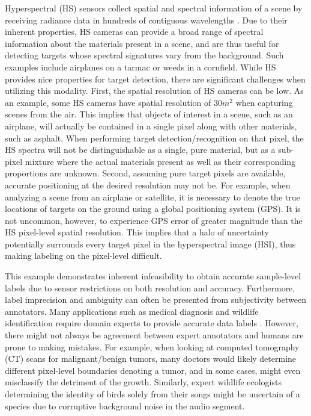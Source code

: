 Hyperspectral (HS) sensors collect spatial and spectral information of a scene by receiving radiance data in hundreds of contiguous wavelengths \citep{Zare2008Thesis}.  Due to their inherent properties, HS cameras can provide a broad range of spectral information about the materials present in a scene, and are thus useful for detecting targets whose spectral signatures vary from the background.  Such examples include airplanes on a tarmac or weeds in a cornfield.  While HS provides nice properties for target detection, there are significant challenges when utilizing this modality.  First, the spatial resolution of HS cameras can be low.  As an example, some HS cameras have spatial resolution of $30m^2$ when capturing scenes from the air.  This implies that objects of interest in a scene, such as an airplane, will actually be contained in a single pixel along with other materials, such as asphalt.  When performing target detection/recognition on that pixel, the HS spectra will not be distinguishable as a single, pure material, but as a sub-pixel mixture where the actual materials present as well as their corresponding proportions are unknown. Second, assuming pure target pixels are available, accurate positioning at the desired resolution may not be.  For example, when analyzing a scene from an airplane or satellite, it is necessary to denote the true locations of targets on the ground using a global positioning system (GPS). It is not uncommon, however, to experience GPS error of greater magnitude than the HS pixel-level spatial resolution.  This implies that a halo of uncertainty potentially surrounds every target pixel in the hyperspectral image (HSI), thus making labeling on the pixel-level difficult.

This example demonstrates inherent infeasibility to obtain accurate sample-level labels due to sensor restrictions on both resolution and accuracy.  Furthermore, label imprecision and ambiguity can often be presented from subjectivity between annotators. Many applications such as medical diagnosis and wildlife identification require domain experts to provide accurate data labels \citep{Cheplygina2019MILSurvey,RuizMunoz2015MILBirdsongClassification}.  However, there might not always be agreement between expert annotators and humans are prone to making mistakes.  For example, when looking at computed tomography (CT) scans for malignant/benign tumors, many doctors would likely determine different pixel-level boundaries denoting a tumor, and in some cases, might even misclassify the detriment of the growth.  Similarly, expert wildlife  ecologists determining the identity of birds solely from their songs might be uncertain of a species due to corruptive background noise in the audio segment.

